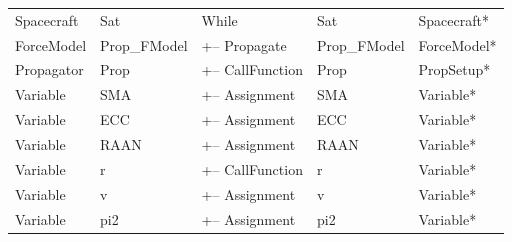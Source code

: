 \begin{center}
\tablelasttail{\hline}
\begin{supertabular}{|l l|l|l|l|}
Spacecraft & Sat & While & Sat & Spacecraft*\\
ForceModel & Prop\_FModel & +-- Propagate & Prop\_FModel & ForceModel* \\
Propagator & Prop & +-- CallFunction & Prop & PropSetup*\\
Variable & SMA & +-- Assignment & SMA & Variable* \\
Variable & ECC & +-- Assignment & ECC & Variable* \\
Variable & RAAN & +-- Assignment & RAAN & Variable* \\
Variable & r & +-- CallFunction & r & Variable* \\
Variable & v & +-- Assignment & v & Variable* \\
Variable & pi2 & +-- Assignment & pi2 & Variable* \\

\end{supertabular}
\end{center}
